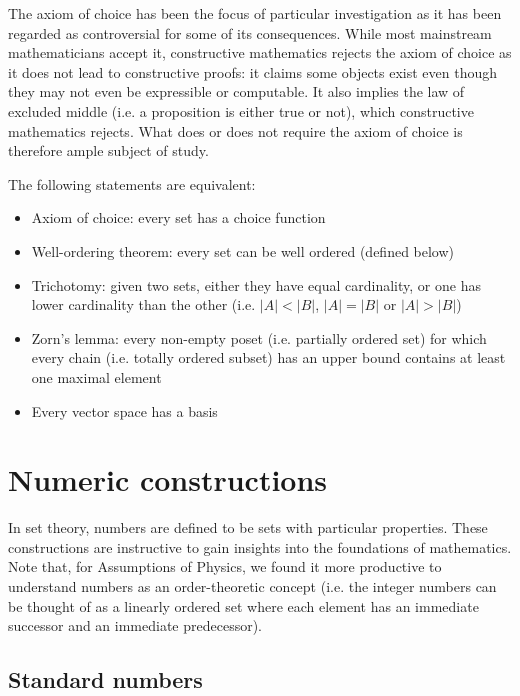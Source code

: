 \documentclass{article}
\begin{document}
The axiom of choice has been the focus of particular investigation as it has been regarded as controversial for some of its consequences. While most mainstream mathematicians accept it, constructive mathematics rejects the axiom of choice as it does not lead to constructive proofs: it claims some objects exist even though they may not even be expressible or computable. It also implies the law of excluded middle (i.e. a proposition is either true or not), which constructive mathematics rejects. What does or does not require the axiom of choice is therefore ample subject of study.

\begin{prop}
	The following statements are equivalent:
	\begin{itemize}
		\item Axiom of choice: every set has a choice function
		\item Well-ordering theorem: every set can be well ordered (defined below)
		\item Trichotomy: given two sets, either they have equal cardinality, or one has lower cardinality than the other (i.e. $|A| < |B|$, $|A| = |B|$ or $|A| > |B|$)
		\item Zorn's lemma: every non-empty poset (i.e. partially ordered set) for which every chain (i.e. totally ordered subset) has an upper bound contains at least one maximal element
		\item Every vector space has a basis
	\end{itemize}
\end{prop}

\section{Numeric constructions}
In set theory, numbers are defined to be sets with particular properties. These constructions are instructive to gain insights into the foundations of mathematics. Note that, for Assumptions of Physics, we found it more productive to understand numbers as an order-theoretic concept (i.e. the integer numbers can be thought of as a linearly ordered set where each element has an immediate successor and an immediate predecessor).

\subsection{Standard numbers}
\end{document}
